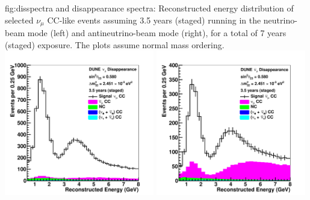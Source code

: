 \begin{dunefigure}{fig:disspectra}
{\numu and \anumu disappearance spectra: Reconstructed energy distribution of selected $\nu_{\mu}$ CC-like events assuming 3.5 years (staged) running in the neutrino-beam mode (left) and antineutrino-beam mode (right), for a total of 7 years (staged) exposure. The plots assume normal mass ordering.}
\includegraphics[width=0.49\textwidth]{graphics/spec_dis_nu.pdf}
\includegraphics[width=0.49\textwidth]{graphics/spec_dis_anu.pdf}
\end{dunefigure}



